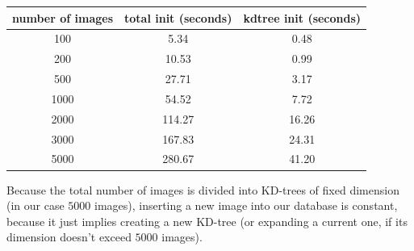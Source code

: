 \begin{center}
\begin{tabular} {c | c | c}
	number of images & total init (seconds) & kdtree init (seconds) \\
	\hline
	100 & 5.34 & 0.48 \\
	200 & 10.53 & 0.99 \\
	500 & 27.71 & 3.17 \\
	1000 & 54.52 & 7.72 \\
	2000 & 114.27 & 16.26 \\
	3000 & 167.83 & 24.31 \\
	5000 & 280.67 & 41.20 \\
\end{tabular}
\end{center}

Because the total number of images is divided into KD-trees of fixed dimension (in our case $5000$ images), inserting a new image into our database is constant, because it just implies creating a new KD-tree (or expanding a current one, if its dimension doesn't exceed $5000$ images).
